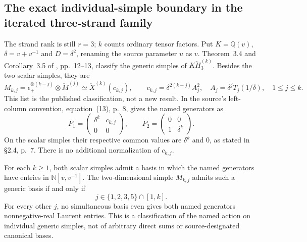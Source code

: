 \subsection{The exact individual-simple boundary in the iterated three-strand family}

The strand rank is still \(r=3\); \(k\) counts ordinary
tensor factors. Put \(K=\mathbb Q(v)\),
\(\delta=v+v^{-1}\) and \(D=\delta^2\), renaming the
source parameter \(u\) as \(v\).
Theorem~3.4 and Corollary~3.5 of \cite{BlasiakChebyshev},
pp.~12--13, classify the generic simples of
\(K\check H_3^{(k)}\). Besides the two scalar simples,
they are
\begin{equation}\label{eq:simpleEffectivitySourceLabels}
 M_{k,j}=\epsilon_+^{\otimes(k-j)}\otimes\check M^{(j)}
       \simeq\check X^{(k)}(c_{k,j}),
 \qquad
 c_{k,j}=\delta^{2(k-j)}A_j^2,
 \quad A_j=\delta^jT_j(1/\delta),
 \quad 1\le j\le k.
\end{equation}
This list is the published classification, not a new result.
In the source's left-column convention, equation~(13),
p.~8, gives the named generators as
\begin{equation}\label{eq:simpleEffectivitySourceMatrices}
 P_1=\begin{pmatrix}\delta^k&c_{k,j}\\0&0\end{pmatrix},
 \qquad
 P_2=\begin{pmatrix}0&0\\1&\delta^k\end{pmatrix}.
\end{equation}
On the scalar simples their respective common values are
\(\delta^k\) and \(0\), as stated in \S2.4, p.~7.
There is no additional normalization of \(c_{k,j}\).

\begin{finding}
\label{f:iteratedSimpleEffectivityClassification}
For each \(k\ge1\), both scalar simples admit a basis in
which the named generators have entries in
\(\mathbb N[v,v^{-1}]\). The two-dimensional simple
\(M_{k,j}\) admits such a generic basis if and only if
\[
                 j\in\{1,2,3,5\}\cap[1,k].
\]
For every other \(j\), no simultaneous basis even gives
both named generators nonnegative-real Laurent entries.
This is a classification of the named action on individual
generic simples, not of arbitrary direct sums or
source-designated canonical bases.
\end{finding}

